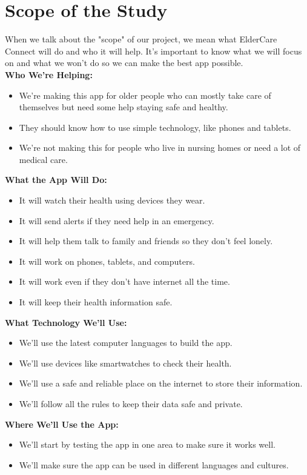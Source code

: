 \section{Scope of the Study}
When we talk about the "scope" of our project, we mean what ElderCare Connect will do and who it will help. It's important to know what we will focus on and what we won't do so we can make the best app possible.\\
\textbf{Who We're Helping:}
\begin{itemize}
    \item We're making this app for older people who can mostly take care of themselves but need some help staying safe and healthy.
    \item They should know how to use simple technology, like phones and tablets.
    \item We're not making this for people who live in nursing homes or need a lot of medical care.
\end{itemize}
\textbf{What the App Will Do:}
\begin{itemize}
    \item It will watch their health using devices they wear.
    \item It will send alerts if they need help in an emergency.
    \item It will help them talk to family and friends so they don't feel lonely.
    \item It will work on phones, tablets, and computers.
    \item It will work even if they don't have internet all the time.
    \item It will keep their health information safe.
\end{itemize}
\textbf{What Technology We'll Use:}
\begin{itemize}
    \item We'll use the latest computer languages to build the app.
    \item We'll use devices like smartwatches to check their health.
    \item We'll use a safe and reliable place on the internet to store their information.
    \item We'll follow all the rules to keep their data safe and private.
\end{itemize}
\textbf{Where We'll Use the App:}
\begin{itemize}
    \item We'll start by testing the app in one area to make sure it works well.
    \item We'll make sure the app can be used in different languages and cultures.
\end{itemize}
